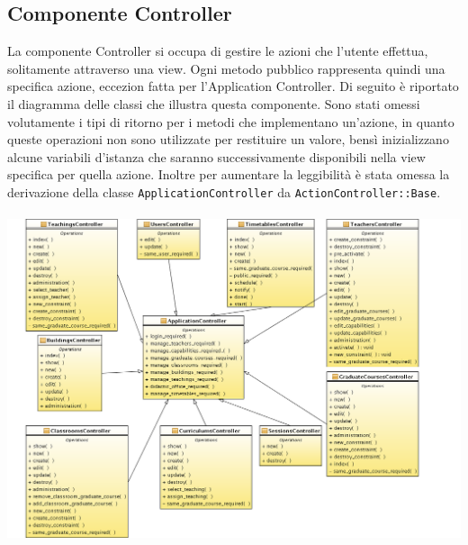 \documentclass[11pt,a4paper]{article}
\begin{document}
\subsection{Componente Controller}
La componente Controller si occupa di gestire le azioni che l'utente effettua, solitamente attraverso una view. Ogni metodo pubblico rappresenta quindi una specifica azione, eccezion fatta per l'Application Controller.
Di seguito è riportato il diagramma delle classi che illustra questa componente. Sono stati omessi volutamente i tipi di ritorno per i metodi che implementano un'azione, in quanto queste operazioni non sono utilizzate per restituire un valore, bensì inizializzano alcune variabili d'istanza che saranno successivamente disponibili nella view specifica per quella azione. Inoltre per aumentare la leggibilità è stata omessa la derivazione della classe \verb|ApplicationController| da \verb|ActionController::Base|. \\
\bigskip \\
\includegraphics[scale=0.34]{images/Controller_ClassDiagram.png}
\end{document}
